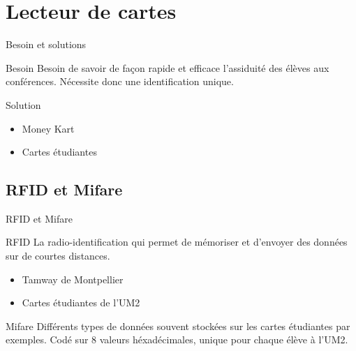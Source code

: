 \section{Lecteur de cartes}
\begin{frame}{Besoin et solutions}
	\begin{block}{Besoin}
        Besoin de savoir de façon rapide et efficace l'assiduité des élèves aux 
        conférences. Nécessite donc une identification unique.
	\end{block}

	\begin{block}{Solution}
	    \begin{itemize}
            \item Money Kart
            \item Cartes étudiantes
	    \end{itemize}
	\end{block}
\end{frame}


\subsection{RFID et Mifare}
\begin{frame}{RFID et Mifare}
	\begin{block}{RFID}
        La radio-identification qui permet de mémoriser et d'envoyer des données sur
        de courtes distances.

	    \begin{itemize}
            \item Tamway de Montpellier
            \item Cartes étudiantes de l'UM2
	    \end{itemize}
	\end{block}

	\begin{block}{Mifare}
        Différents types de données souvent stockées sur les cartes étudiantes par
        exemples. Codé sur 8 valeurs héxadécimales, unique pour chaque élève à l'UM2.
	\end{block}
\end{frame}


